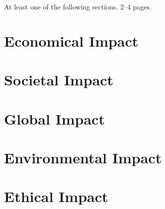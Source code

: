 \begin{chapterpage}
\end{chapterpage}
\noindent
At least one of the following sections. 2--4 pages.
\section{Economical Impact}
\section{Societal Impact}
\section{Global Impact}
\section{Environmental Impact}
\section{Ethical Impact}

